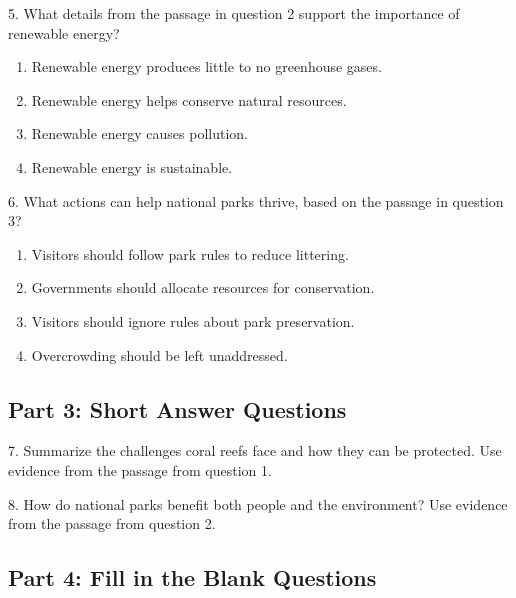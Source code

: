 \documentclass[12pt]{article}
\begin{document}
\vspace{1cm}

5. What details from the passage in question 2 support the importance of renewable energy?\\
\begin{enumerate}[label=\Alph*.]
    \item Renewable energy produces little to no greenhouse gases.  
    \item Renewable energy helps conserve natural resources.  
    \item Renewable energy causes pollution.  
    \item Renewable energy is sustainable.  
\end{enumerate}

\vspace{1cm}

6. What actions can help national parks thrive, based on the passage in question 3?\\
\begin{enumerate}[label=\Alph*.]
    \item Visitors should follow park rules to reduce littering.  
    \item Governments should allocate resources for conservation.  
    \item Visitors should ignore rules about park preservation.  
    \item Overcrowding should be left unaddressed.  
\end{enumerate}

\vspace{1cm}
\newpage
\subsection*{Part 3: Short Answer Questions}

7. Summarize the challenges coral reefs face and how they can be protected. Use evidence from the passage from question 1.\\
\vspace{4cm}

8. How do national parks benefit both people and the environment? Use evidence from the passage from question 2.\\
\vspace{4cm}

\subsection*{Part 4: Fill in the Blank Questions}
\end{document}
